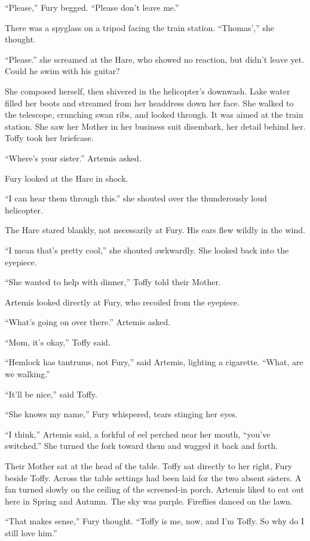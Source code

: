 \documentclass[11pt,a5paper]{article}
\begin{document}
``Please,'' Fury begged. ``Please don't leave me.''

There was a spyglass on a tripod facing the train station. ``Thomas','' she thought.

``Please.'' she screamed at the Hare, who showed no reaction, but didn't leave yet. Could he swim with his guitar?

She composed herself, then shivered in the helicopter's downwash. Lake water filled her boots and streamed from her headdress down her face. She walked to the telescope, crunching swan ribs, and looked through. It was aimed at the train station. She saw her Mother in her business suit disembark, her detail behind her. Toffy took her briefcase.

``Where's your sister.'' Artemis asked.

Fury looked at the Hare in shock.

``I can hear them through this.'' she shouted over the thunderously loud helicopter.

The Hare stared blankly, not necessarily at Fury. His ears flew wildly in the wind. 

``I mean that's pretty cool,'' she shouted awkwardly. She looked back into the eyepiece.

``She wanted to help with dinner,'' Toffy told their Mother.

Artemis looked directly at Fury, who recoiled from the eyepiece.

``What's going on over there.'' Artemis asked.

``Mom, it's okay,'' Toffy said.

``Hemlock has tantrums, not Fury,'' said Artemis, lighting a cigarette. ``What, are we walking.''

``It'll be nice,'' said Toffy.

``She knows my name,'' Fury whispered, tears stinging her eyes.



``I think,'' Artemis said, a forkful of eel perched near her mouth, ``you've switched.'' She turned the fork toward them and wagged it back and forth.

Their Mother sat at the head of the table. Toffy sat directly to her right, Fury beside Toffy. Across the table settings had been laid for the two absent sisters. A fan turned slowly on the ceiling of the screened-in porch. Artemis liked to eat out here in Spring and Autumn. The sky was purple. Fireflies danced on the lawn.

``That makes sense,'' Fury thought. ``Toffy is me, now, and I'm Toffy. So why do I still love him.''
\end{document}
